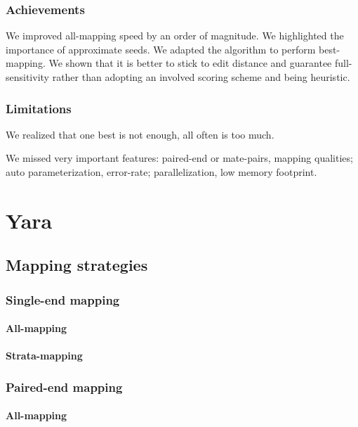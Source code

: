 \subsection{Achievements}

We improved all-mapping speed by an order of magnitude.
We highlighted the importance of approximate seeds.
We adapted the algorithm to perform best-mapping.
We shown that it is better to stick to edit distance and guarantee full-sensitivity rather than adopting an involved scoring scheme and being heuristic.

\subsection{Limitations}

We realized that one best is not enough, all often is too much.

We missed very important features: paired-end or mate-pairs, mapping qualities; auto parameterization, error-rate; parallelization, low memory footprint.



\chapter{Yara}


\section{Mapping strategies}

\subsection{Single-end mapping}
\subsubsection{All-mapping}
\subsubsection{Strata-mapping}

\subsection{Paired-end mapping}
\subsubsection{All-mapping}
